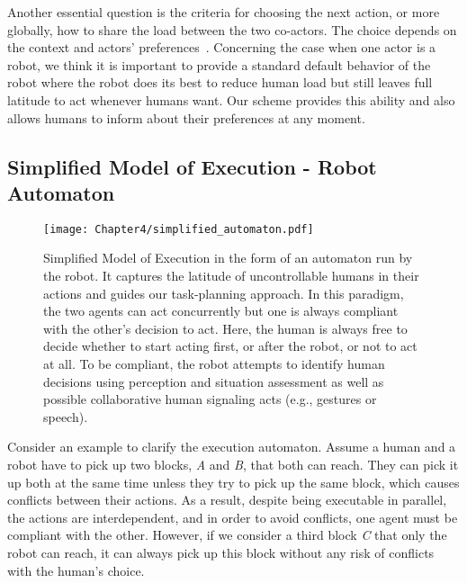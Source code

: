 Another essential question is the criteria for choosing the next action, or more globally, how to share the load between the two co-actors. The choice depends on the context and actors' preferences~\cite{Gombolay-2015, Strachan-2020, Curioni-2022}. 
Concerning the case when one actor is a robot, we think it is important to provide a standard default behavior of the robot where the robot does its best to reduce human load but still leaves full latitude to act whenever humans want. 
Our scheme provides this ability and also allows humans to inform about their preferences at any moment.

\subsection{Simplified Model of Execution - Robot Automaton}

\begin{figure}
    \centering
    \texttt{[image: Chapter4/simplified\_automaton.pdf]}
    \caption{
    Simplified Model of Execution in the form of an automaton run by the robot. It captures the latitude of uncontrollable humans in their actions and guides our task-planning approach.
    In this paradigm, the two agents can act concurrently but one is always compliant with the other's decision to act.
    Here, the human is always free to decide whether to start acting first, or after the robot, or not to act at all.
    To be compliant, the robot attempts to identify human decisions using perception and situation assessment as well as possible collaborative human signaling acts (e.g., gestures or speech).
    }
    \label{fig:model_of_execution}
\end{figure}



Consider an example to clarify the execution automaton. 
Assume a human and a robot have to pick up two blocks, \textit{A} and \textit{B}, that both can reach. 
They can pick it up both at the same time unless they try to pick up the same block, which causes conflicts between their actions. 
As a result, despite being executable in parallel, the actions are interdependent, and in order to avoid conflicts, one agent must be compliant with the other. 
However, if we consider a third block \textit{C} that only the robot can reach, it can always pick up this block without any risk of conflicts with the human's choice. 

